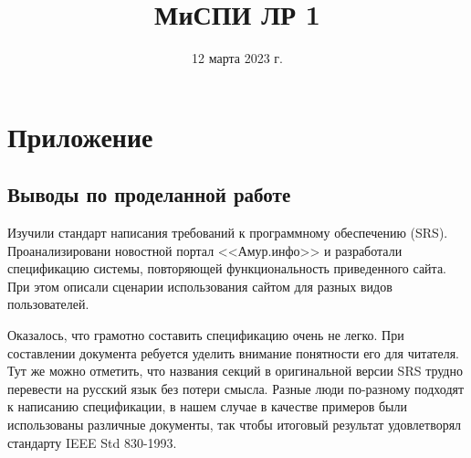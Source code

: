 \def\projectname{Веб-сайт АМУР.Инфо}
\def\myversion{1.0}
\def\authors{%
    Тюрин Иван\\%
    и Беляков Дмитрий%
}
\def\assignee{Бострикова Д. К. (Практик)}
\date{12 марта 2023 г.}
\title{МиСПИ ЛР 1}




    
    
    {
        \tableofcontents
    }
    
    
    

    \newpage
    \chapter{Приложение}
    \section{Выводы по проделанной работе}
    Изучили стандарт написания требований к программному обеспечению (SRS). Проанализировани новостной портал <<Амур.инфо>> и разработали спецификацию системы, повторяющей функциональность приведенного сайта. При этом описали сценарии использования сайтом для разных видов пользователей. 

    Оказалось, что грамотно составить спецификацию очень не легко. При составлении документа ребуется уделить внимание понятности его для читателя. Тут же можно отметить, что названия секций в оригинальной версии SRS трудно перевести на русский язык без потери смысла. Разные люди по-разному подходят к написанию спецификации, в нашем случае в качестве примеров были использованы различные документы, так чтобы итоговый результат удовлетворял стандарту IEEE Std 830-1993.

    

